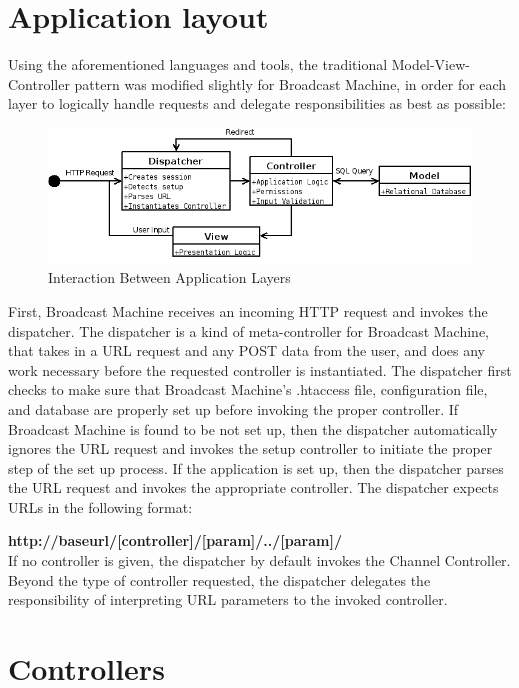 \documentclass[a4paper,12pt]{report}
\begin{document}
\section{Application layout}
Using the aforementioned languages and tools, the traditional Model-View-Controller pattern was modified slightly for Broadcast Machine, in order for each layer to logically handle requests and delegate responsibilities as best as possible:

\begin{figure}[h]
\begin{center}
\includegraphics[scale=0.5]{./images/flow.png}
\end{center}
\caption{Interaction Between Application Layers}
\end{figure}

First, Broadcast Machine receives an incoming HTTP request and invokes the dispatcher. The dispatcher is a kind of meta-controller for Broadcast Machine, that takes in a URL request and any POST data from the user, and does any work necessary before the requested controller is instantiated. The dispatcher first checks to make sure that Broadcast Machine's .htaccess file, configuration file, and database are properly set up before invoking the proper controller. If Broadcast Machine is found to be not set up, then the dispatcher automatically ignores the URL request and invokes the setup controller to initiate the proper step of the set up process. If the application is set up, then the dispatcher parses the URL request and invokes the appropriate controller. The dispatcher expects URLs in the following format:

\textbf{http://baseurl/[controller]/[param]/../[param]/} \\

If no controller is given, the dispatcher by default invokes the Channel Controller. Beyond the type of controller requested, the dispatcher delegates the responsibility of interpreting URL parameters to the invoked controller.

\section{Controllers}
\end{document}
